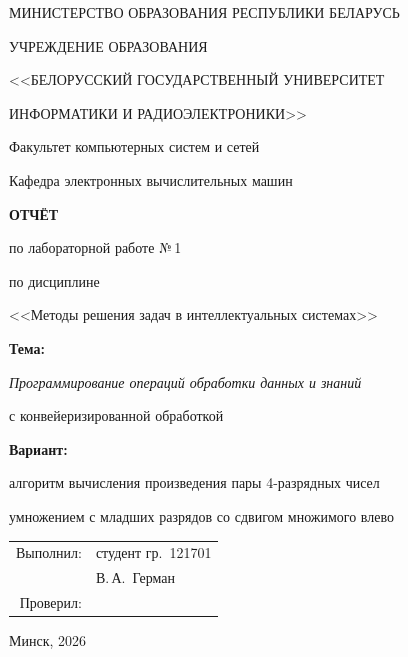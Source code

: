 \documentclass[12pt,a4paper]{article}
\begin{document}
\begin{titlepage}
  \centering
  \vspace*{0.4cm}
  {\small МИНИСТЕРСТВО ОБРАЗОВАНИЯ РЕСПУБЛИКИ БЕЛАРУСЬ\par}
  {\small УЧРЕЖДЕНИЕ ОБРАЗОВАНИЯ\par}
  {\small <<БЕЛОРУССКИЙ ГОСУДАРСТВЕННЫЙ УНИВЕРСИТЕТ\par
  ИНФОРМАТИКИ И РАДИОЭЛЕКТРОНИКИ>>\par}
  \vspace{0.6cm}
  {\small Факультет компьютерных систем и сетей\par}
  {\small Кафедра электронных вычислительных машин\par}

  \vspace{3.5cm}
  {\large\bfseries ОТЧЁТ\par}
  \vspace{0.3cm}
  {\large по лабораторной работе №\,1\par}
  \vspace{0.3cm}
  {\large по дисциплине\par}
  \vspace{0.2cm}
  {\large <<Методы решения задач в интеллектуальных системах>>\par}

  \vspace{1.0cm}
  {\bfseries\large Тема:\par}
  {\itshape Программирование операций обработки данных и знаний\par
   с конвейеризированной обработкой\par}

  \vspace{1.5cm}
  {\bfseries Вариант:\par}
  алгоритм вычисления произведения пары 4-разрядных чисел\par
  умножением с младших разрядов со сдвигом множимого влево\par

  \vfill
  \begin{flushright}
    \begin{tabular}{rl}
      Выполнил: & студент гр.~121701 \\
                & В.\,А.~Герман      \\[6pt]
      Проверил: & \\
    \end{tabular}
  \end{flushright}

  \vspace{1.2cm}
  \centerline{Минск, 2026}
\end{titlepage}
\end{document}

